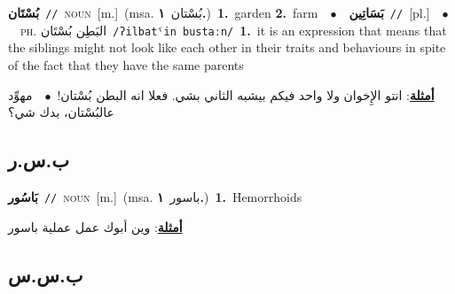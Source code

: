 \documentclass[10pt,a4paper,twoside]{article} %
\begin{document}
\begin{multicols}{2}
{\setlength\topsep{0pt}\textbf{\foreignlanguage{arabic}{بُسْتَان}}\ {\color{gray}\texttt{//}\color{black}}\ \textsc{noun}\ [m.]\ \color{gray}(msa. \foreignlanguage{arabic}{بُسْتان}~\foreignlanguage{arabic}{\textbf{١.}})\color{black}\ \textbf{1.}~garden  \textbf{2.}~farm\ \ $\bullet$\ \ \setlength\topsep{0pt}\textbf{\foreignlanguage{arabic}{بَسَاتِين}}\ {\color{gray}\texttt{//}\color{black}}\ [pl.]\ \ $\bullet$\ \ \textsc{ph.} \color{gray} \foreignlanguage{arabic}{البَطِن بُسْتَان}\color{black}\ {\color{gray}\texttt{/{\sffamily ʔilbatˤin bustaːn}/}\color{black}}\ \textbf{1.}~it is an expression that means that the siblings might not look like each other in their traits and behaviours in spite of the fact that they have the same parents\  \begin{flushright}\color{gray}\foreignlanguage{arabic}{\textbf{\underline{\foreignlanguage{arabic}{أمثلة}}}: انتو الإِخوان ولا واحد فيكم بيشبه الثاني بشي. فعلا انه البطن بُسْتان!\ $\bullet$\ \  مهوِّد عالبُسْتان، بدك شي؟}\end{flushright}\color{black}} \vspace{2mm}

\vspace{-3mm}
\subsection*{\color{blue}\foreignlanguage{arabic}{ب.س.ر}\color{blue}{}} 

{\setlength\topsep{0pt}\textbf{\foreignlanguage{arabic}{بَاسُور}}\ {\color{gray}\texttt{//}\color{black}}\ \textsc{noun}\ [m.]\ \color{gray}(msa. \foreignlanguage{arabic}{باسور}~\foreignlanguage{arabic}{\textbf{١.}})\color{black}\ \textbf{1.}~Hemorrhoids\  \begin{flushright}\color{gray}\foreignlanguage{arabic}{\textbf{\underline{\foreignlanguage{arabic}{أمثلة}}}: وين أبوك عمل عملية باسور}\end{flushright}\color{black}} \vspace{2mm}

\vspace{-3mm}
\subsection*{\color{blue}\foreignlanguage{arabic}{ب.س.س}\color{blue}{}} 


\end{multicols}
\end{document}
